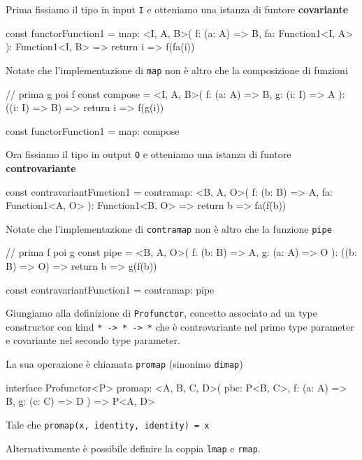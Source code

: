 \documentclass[12pt]{article}
\theoremstyle{definition}
\newenvironment{code}
  {\vspace{0.5cm} \VerbatimEnvironment\begin{typescriptcode}}
  {\end{typescriptcode} \vspace{0.2cm}}
\begin{document}
Prima fissiamo il tipo in input \texttt{I} e otteniamo una istanza di funtore \textbf{covariante}

\begin{code}
const functorFunction1 = {
  map: <I, A, B>(
    f: (a: A) => B,
    fa: Function1<I, A>
  ): Function1<I, B> => {
    return i => f(fa(i))
  }
}
\end{code}

Notate che l'implementazione di \texttt{map} non è altro che la composizione di funzioni

\begin{code}
// prima g poi f
const compose = <I, A, B>(
  f: (a: A) => B,
  g: (i: I) => A
): ((i: I) => B) => {
  return i => f(g(i))
}

const functorFunction1 = {
  map: compose
}
\end{code}

Ora fissiamo il tipo in output \texttt{O} e otteniamo una istanza di funtore \textbf{controvariante}

\begin{code}
const contravariantFunction1 = {
  contramap: <B, A, O>(
    f: (b: B) => A,
    fa: Function1<A, O>
  ): Function1<B, O> => {
    return b => fa(f(b))
  }
}
\end{code}

Notate che l'implementazione di \texttt{contramap} non è altro che la funzione \texttt{pipe}

\begin{code}
// prima f poi g
const pipe = <B, A, O>(
  f: (b: B) => A,
  g: (a: A) => O
): ((b: B) => O) => {
  return b => g(f(b))
}

const contravariantFunction1 = {
  contramap: pipe
}
\end{code}

Giungiamo alla definizione di \texttt{Profunctor}, concetto associato ad un type constructor con kind \texttt{* -> * -> *} che è
controvariante nel primo type parameter e covariante nel secondo type parameter.

La sua operazione è chiamata \texttt{promap} (sinonimo \texttt{dimap})

\begin{code}
interface Profunctor<P> {
  promap: <A, B, C, D>(
    pbc: P<B, C>,
    f: (a: A) => B,
    g: (c: C) => D
  ) => P<A, D>
}
\end{code}

Tale che \texttt{promap(x, identity, identity) = x}

Alternativamente è possibile definire la coppia \texttt{lmap} e \texttt{rmap}.
\end{document}
